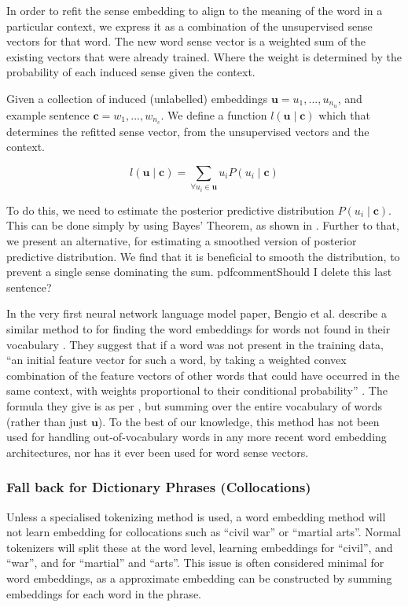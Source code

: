 \documentclass{sig-alternate}
\renewcommand{\c}{\mathbf{c}}
\renewcommand{\u}{\mathbf{u}}
\begin{document}
In order to refit the sense embedding to align to the meaning of the word in a particular context, we express it as a combination of the unsupervised sense vectors for that word.
The new word sense vector is a weighted sum of the existing vectors that were already trained. Where the weight is determined by the probability of each induced sense given the context.


Given a collection of induced (unlabelled) embeddings $\u={u_1,...,u_{n_u}}$, and example sentence $\c={w_1,...,w_{n_c}}$. We define a function $l(\u \mid \c )$ which that determines the refitted sense vector, from the unsupervised vectors and the context.

\begin{equation} \label{eq:synth}
l(\u \mid \c ) = \sum_{\forall u_i \in \u} u_i P(u_i \mid \c)
\end{equation}

To do this, we need to estimate the posterior predictive distribution $P(u_i \mid \c)$.
This can be done simply by using Bayes' Theorem, as shown in . Further to that, we present an alternative, for estimating a smoothed version of posterior predictive distribution. We find that it is beneficial to smooth the distribution, to prevent a single sense dominating the sum.  pdfcomment{Should I delete this last sentence?}

In the very first neural network language model paper, Bengio et al. describe a similar method to  for finding the word embeddings for words not found in their vocabulary \parencite{NPLM}. They suggest that if a word was not present in the training data, \enquote{an initial feature vector for such a word, by taking a weighted convex combination of the feature vectors of other words that could have occurred in the same context, with weights proportional to their conditional probability} \parencite{NPLM}. The formula they give is as per , but summing over the entire vocabulary of words (rather than just $\u$). To the best of our knowledge, this method has not been used for handling out-of-vocabulary words in any more recent word embedding architectures, nor has it ever been used for word sense vectors.


\subsubsection {Fall back for Dictionary Phrases (Collocations)}
Unless a specialised tokenizing method is used, a word embedding method will not learn embedding for collocations such as ``civil war'' or ``martial arts''. Normal tokenizers will split these at the word level, learning embeddings for ``civil'', and ``war'', and for ``martial'' and ``arts''. This issue is often considered minimal for word embeddings, as a approximate embedding can be constructed by summing embeddings for each word in the phrase.
\end{document}

